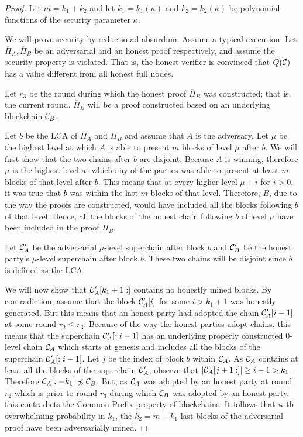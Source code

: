 \begin{proof}
    Let $m = k_1 + k_2$ and let $k_1 = k_1(\kappa)$ and $k_2 = k_2(\kappa)$ be
    polynomial functions of the security parameter $\kappa$.

    We will prove security by reductio ad absurdum. Assume a typical execution.
    Let $\overline{\Pi}_A, \overline{\Pi}_B$ be an adversarial and an honest
    proof respectively, and assume the security property is violated. That is,
    the honest verifier is convinced that $Q(\mathcal{C})$ has a value different
    from all honest full nodes.

    Let $r_3$ be the round during which the honest proof $\overline{\Pi}_B$ was
    constructed; that is, the current round. $\overline{\Pi}_B$ will be a proof
    constructed based on an underlying blockchain $\mathcal{C}_B$.

    Let $b$ be the LCA of $\overline{\Pi}_A$ and $\overline{\Pi}_B$ and assume
    that $A$ is the adversary. Let $\mu$ be the highest level at which $A$
    is able to present $m$ blocks of level $\mu$ after $b$. We will first show
    that the two chains after $b$ are disjoint. Because $A$ is winning,
    therefore $\mu$ is the highest level at which any of the parties was able
    to present at least $m$ blocks of that level after $b$.  This means that at
    every higher level $\mu + i$ for $i > 0$, it was true that $b$ was within
    the last $m$ blocks of that level.  Therefore, $B$, due to the way the
    proofs are constructed, would have included all the blocks following $b$ of
    that level. Hence, all the blocks of the honest chain following $b$ of
    level $\mu$ have been included in the proof $\overline{\Pi}_B$.

    Let $\mathcal{C}'_A$ be the adversarial $\mu$-level superchain after block $b$
    and $\mathcal{C}'_B$ be the honest party's $\mu$-level superchain after block
    $b$.  These two chains will be disjoint since $b$ is defined as the LCA.

    We will now show that $\mathcal{C}'_A[k_1 + 1:]$ contains no honestly mined
    blocks. By contradiction, assume that the block $\mathcal{C}'_A[i]$ for some $i
    > k_1 + 1$ was honestly generated. But this means that an honest party had
    adopted the chain $\mathcal{C}'_A[i - 1]$ at some round $r_2 \leq r_3$. Because
    of the way the honest parties adopt chains, this means that the superchain
    $\mathcal{C}'_A[:i - 1]$ has an underlying properly constructed $0$-level chain
    $\mathcal{C}_A$ which starts at genesis and includes all the blocks of the
    superchain $\mathcal{C}'_A[:i - 1]$. Let $j$ be the index of block $b$ within
    $\mathcal{C}_A$.  As $\mathcal{C}_A$ contains at least all the blocks of the
    superchain $\mathcal{C}'_A$, observe that $|\mathcal{C}_A[j + 1:]| \geq i - 1 > k_1$.
    Therefore $\mathcal{C}_A[:-k_1] \not\preccurlyeq \mathcal{C}_B$. But, as $\mathcal{C}_A$
    was adopted by an honest party at round $r_2$ which is prior to round $r_3$
    during which $\mathcal{C}_B$ was adopted by an honest party, this contradicts
    the Common Prefix property of blockchains. It follows that with
    overwhelming probability in $k_1$, the $k_2 = m - k_1$ last blocks of the
    adversarial proof have been adversarially mined.


\end{proof}

